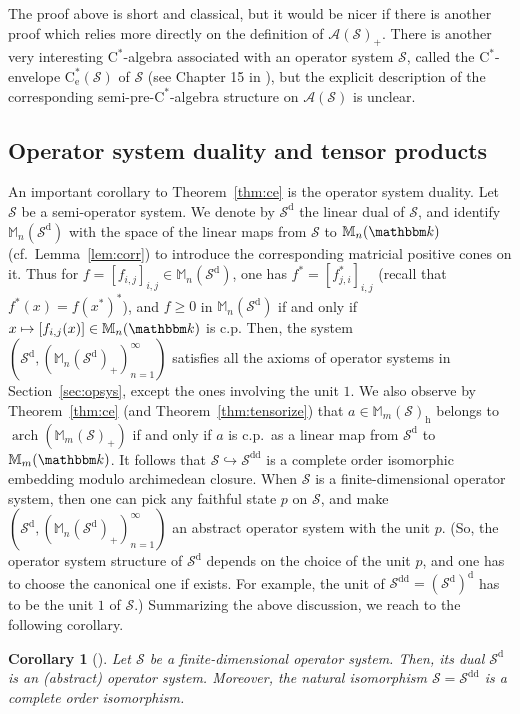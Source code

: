 \documentclass[12pt]{amsart}
\newtheorem{cor}[thm]{Corollary}
\theoremstyle{definition}
\begin{document}
The proof above is short and classical, but it would be nicer if there is another proof which
relies more directly on the definition of ${{\mathcal A}}({{\mathcal S}})_+$. There is another very
interesting {$\mathrm{C}^*$-alge\-bra\xspace} associated with an operator system ${{\mathcal S}}$, called the
$\mathrm{C}^*$-envelope $\mathrm{C}^*_{\mathrm{e}}({{\mathcal S}})$ of ${{\mathcal S}}$ (see Chapter 15 in \cite{paulsen}),
but the explicit description of the corresponding {semi-pre-$\mathrm{C}^*$-alge\-bra\xspace} structure on ${{\mathcal A}}({{\mathcal S}})$ is unclear.
\subsection{Operator system duality and tensor products}
An important corollary to Theorem~\ref{thm:ce} is the operator system duality.
Let ${{\mathcal S}}$ be a semi-operator system. We denote by ${{\mathcal S}}^{\mathrm{d}}$ the linear dual of ${{\mathcal S}}$,
and identify ${{\mathbb M}}_n({{\mathcal S}}^{\mathrm{d}})$ with the space of
the linear maps from ${{\mathcal S}}$ to ${{\mathbb M}}_n({{\mathbbm k}})$ (cf.\ Lemma~\ref{lem:corr}) to
introduce the corresponding matricial positive cones on it.
Thus for $f=[f_{i,j}]_{i,j}\in{{\mathbb M}}_n({{\mathcal S}}^{\mathrm{d}})$, one has
$f^*=[f^*_{j,i}]_{i,j}$ (recall that $f^*(x)=f(x^*)^*$),
and $f\geq0$ in ${{\mathbb M}}_n({{\mathcal S}}^{\mathrm{d}})$ if and only if $x\mapsto [f_{i,j}(x)]\in{{\mathbb M}}_n({{\mathbbm k}})$ is
c.p. Then, the system $({{\mathcal S}}^{\mathrm{d}}, ({{\mathbb M}}_n({{\mathcal S}}^{\mathrm{d}})_+)_{n=1}^\infty)$ satisfies all the axioms
of operator systems in Section~\ref{sec:opsys}, except the ones involving the unit $1$.
We also observe by Theorem~\ref{thm:ce} (and Theorem~\ref{thm:tensorize})
that $a\in{{\mathbb M}}_m({{\mathcal S}})_{\mathrm{h}}$ belongs to $\operatorname*{arch}({{\mathbb M}}_m({{\mathcal S}})_+)$ if and only if $a$ is c.p.\
as a linear map from ${{\mathcal S}}^{\mathrm{d}}$ to ${{\mathbb M}}_m({{\mathbbm k}})$.
It follows that ${{\mathcal S}}\hookrightarrow{{\mathcal S}}^{{\mathrm{d}}{\mathrm{d}}}$ is a complete order isomorphic embedding
modulo archimedean closure.
When ${{\mathcal S}}$ is a finite-dimensional operator system, then one can pick any faithful state $p$
on ${{\mathcal S}}$, and make $({{\mathcal S}}^{\mathrm{d}}, ({{\mathbb M}}_n({{\mathcal S}}^{\mathrm{d}})_+)_{n=1}^\infty)$
an abstract operator system with the unit $p$. (So, the operator system structure of
${{\mathcal S}}^{\mathrm{d}}$ depends on the choice of the unit $p$, and one has to choose the canonical one
if exists. For example, the unit of ${{\mathcal S}}^{{\mathrm{d}}{\mathrm{d}}}=({{\mathcal S}}^{\mathrm{d}})^{\mathrm{d}}$ has to be the unit $1$ of ${{\mathcal S}}$.)
Summarizing the above discussion, we reach to the following corollary.
\begin{cor}[\cite{ce}]\label{cor:ce}
Let ${{\mathcal S}}$ be a finite-dimensional operator system.
Then, its dual ${{\mathcal S}}^{\mathrm{d}}$ is an (abstract) operator system.
Moreover, the natural isomorphism ${{\mathcal S}}={{\mathcal S}}^{{\mathrm{d}}{\mathrm{d}}}$ is a complete order isomorphism.
\end{cor}
\end{document}
